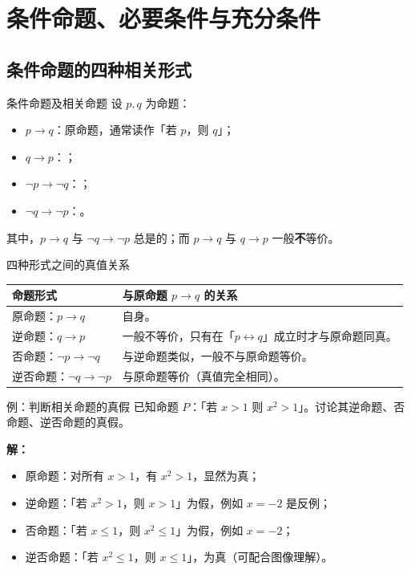 \documentclass[a4paper,11pt]{ctexart}
\begin{document}
\clearpage
\section{条件命题、必要条件与充分条件}

\subsection{条件命题的四种相关形式}

\begin{definitionbox}{条件命题及相关命题}
  设 $p,q$ 为命题：
  \begin{itemize}
    \item $p\to q$：原命题，通常读作「若 $p$，则 $q$」；
    \item $q\to p$：；
    \item $\neg p\to\neg q$：；
    \item $\neg q\to\neg p$：。
  \end{itemize}
  其中，$p\to q$ 与 $\neg q\to\neg p$ 总是的；而 $p\to q$ 与 $q\to p$ 一般\textbf{不}等价。
\end{definitionbox}

\begin{summarybox}{四种形式之间的真值关系}
  \begin{center}
  \begin{tabularx}{0.98\textwidth}{>{\raggedright\arraybackslash}p{3.5cm}X}
    \toprule
    \textbf{命题形式} & \textbf{与原命题 $p\to q$ 的关系} \\
    \midrule
    原命题：$p\to q$ & 自身。 \\
    逆命题：$q\to p$ & 一般不等价，只有在「$p\leftrightarrow q$」成立时才与原命题同真。 \\
    否命题：$\neg p\to\neg q$ & 与逆命题类似，一般不与原命题等价。 \\
    逆否命题：$\neg q\to\neg p$ & 与原命题等价（真值完全相同）。 \\
    \bottomrule
  \end{tabularx}
  \end{center}
\end{summarybox}

\begin{examplebox}{例：判断相关命题的真假}
  已知命题 $P$：「若 $x>1$ 则 $x^2>1$」。讨论其逆命题、否命题、逆否命题的真假。

  \textbf{解：}
  \begin{itemize}
    \item 原命题：对所有 $x>1$，有 $x^2>1$，显然为真；
    \item 逆命题：「若 $x^2>1$，则 $x>1$」为假，例如 $x=-2$ 是反例；
    \item 否命题：「若 $x\le1$，则 $x^2\le1$」为假，例如 $x=-2$；
    \item 逆否命题：「若 $x^2\le1$，则 $x\le1$」，为真（可配合图像理解）。
  \end{itemize}
\end{examplebox}
\end{document}
